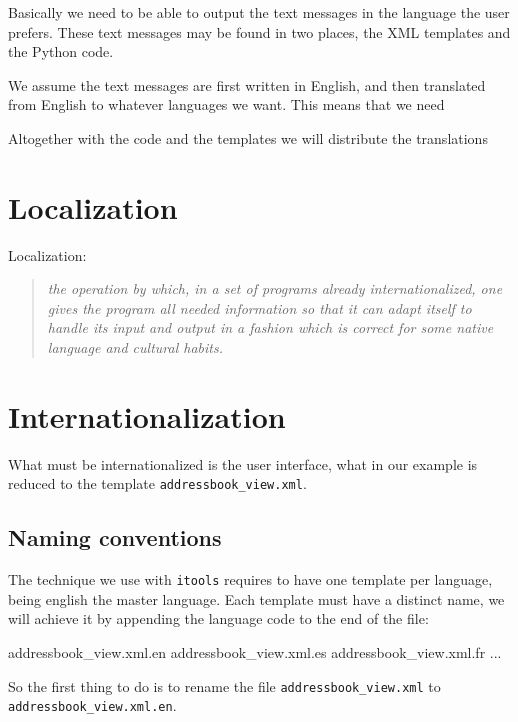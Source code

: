 Basically we need to be able to output the text messages in the language
the user prefers. These text messages may be found in two places, the
XML templates and the Python code.

We assume the text messages are first written in English, and then translated
from English to whatever languages we want. This means that we need 

Altogether with the code and the templates we will distribute the translations


\section{Localization}

Localization:

\begin{quote}
  \em
  the operation by which, in a set of programs already internationalized,
  one gives the program all needed information so that it can adapt itself
  to handle its input and output in a fashion which is correct for some
  native language and cultural habits.
\end{quote}





\section{Internationalization}

What must be internationalized is the user interface, what in our example
is reduced to the template {\tt addressbook\_view.xml}.

\subsection{Naming conventions}

The technique we use with {\tt itools} requires to have one template per
language, being english the master language. Each template must have a
distinct name, we will achieve it by appending the language code to the
end of the file:

\begin{code}
    addressbook_view.xml.en
    addressbook_view.xml.es
    addressbook_view.xml.fr
    ...
\end{code}

So the first thing to do is to rename the file {\tt addressbook\_view.xml}
to {\tt addressbook\_view.xml.en}.

